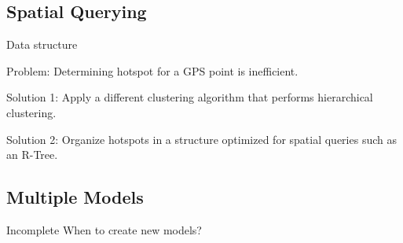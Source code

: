 \subsection{Spatial Querying}
\begin{frame}{Data structure}{}
{
\begin{block}{Problem:}
Determining hotspot for a GPS point is inefficient.
\end{block}
}
\begin{block}{Solution 1:}
Apply a different clustering algorithm that performs hierarchical clustering.
\end{block}
\begin{block}{Solution 2:}
Organize hotspots in a structure optimized for spatial queries such as an R-Tree.
\end{block}
\end{frame}

\subsection{Multiple Models}
\begin{frame}{Incomplete}
When to create new models?
\end{frame}